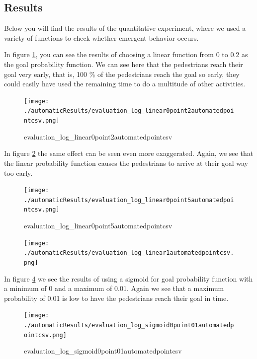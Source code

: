 \documentclass[11pt]{book}
\begin{document}
\subsection{Results}
Below you will find the results of the quantitative experiment, where we used a variety of functions to check whether emergent behavior occurs.

In figure \ref{evaluation_log_linear0point2automatedpointcsv}, you can see the results of choosing a linear function from 0 to 0.2 as the goal probability function. We can see here that the pedestrians reach their goal very early, that is, 100 \% of the pedestrians reach the goal so early, they could easily have used the remaining time to do a multitude of other activities.

\begin{figure}
\centering
\texttt{[image: ./automaticResults/evaluation\_log\_linear0point2automatedpointcsv.png]}
\caption{evaluation\_log\_linear0point2automatedpointcsv}
\label{evaluation_log_linear0point2automatedpointcsv}
\end{figure}

In figure \ref{evaluation_log_linear0point5automatedpointcsv} the same effect can be seen even more exaggerated. Again, we see that the linear probability function causes the pedestrians to arrive at their goal way too early.

\begin{figure}
\centering
\texttt{[image: ./automaticResults/evaluation\_log\_linear0point5automatedpointcsv.png]}
\caption{evaluation\_log\_linear0point5automatedpointcsv}
\label{evaluation_log_linear0point5automatedpointcsv}
\end{figure}

\begin{figure}
\centering
\texttt{[image: ./automaticResults/evaluation\_log\_linear1automatedpointcsv.png]}
\label{evaluation_log_linear1automatedpointcsv}
\end{figure}

In figure \ref{evaluation_log_sigmoid0point01automatedpointcsv} we see the results of using a sigmoid for goal probability function with a minimum  of 0 and a maximum of 0.01. Again we see that a maximum probability of 0.01 is low to have the pedestrians reach their goal in time.

\begin{figure}
\centering
\texttt{[image: ./automaticResults/evaluation\_log\_sigmoid0point01automatedpointcsv.png]}
\caption{evaluation\_log\_sigmoid0point01automatedpointcsv}
\label{evaluation_log_sigmoid0point01automatedpointcsv}
\end{figure}
\end{document}
